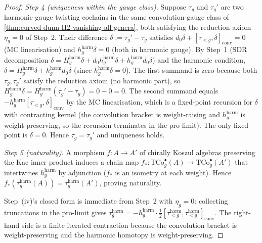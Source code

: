 \begin{proof}
\emph{Step 4 (uniqueness within the gauge class).} Suppose
\(\tau_{g}\) and \(\tau_{g}'\) are two harmonic-gauge twisting
cochains in the same convolution-gauge class of
\autoref{thm:curved-dunn-H2-vanishing-all-genera}, both satisfying
the reduction axiom \(\eta_{g} = 0\) of Step~2. Their difference
\(\delta := \tau_{g}' - \tau_{g}\) satisfies
\(d_{0}\delta + [\tau_{<g}, \delta]_{\mathrm{conv}} = 0\) (MC
linearisation) and \(h^{\mathrm{harm}}_{g}\delta = 0\) (both in
harmonic gauge). By Step~1 (SDR decomposition
\(\delta = H^{\mathrm{harm}}_{g}\delta + d_{0}
h^{\mathrm{harm}}_{g}\delta + h^{\mathrm{harm}}_{g} d_{0}\delta\))
and the harmonic condition, \(\delta = H^{\mathrm{harm}}_{g}\delta
+ h^{\mathrm{harm}}_{g} d_{0}\delta\) (since
\(h^{\mathrm{harm}}_{g}\delta = 0\)). The first summand is zero
because both \(\tau_{g}, \tau_{g}'\) satisfy the reduction axiom
(no harmonic part), so
\(H^{\mathrm{harm}}_{g}\delta = H^{\mathrm{harm}}_{g}(\tau_{g}'
- \tau_{g}) = 0 - 0 = 0\). The second summand equals
\(-h^{\mathrm{harm}}_{g}[\tau_{<g}, \delta]_{\mathrm{conv}}\) by
the MC linearisation, which is a fixed-point recursion for
\(\delta\) with contracting kernel (the convolution bracket is
weight-raising and \(h^{\mathrm{harm}}_{g}\) is weight-preserving,
so the recursion terminates in the pro-limit). The only fixed point
is \(\delta = 0\). Hence \(\tau_{g} = \tau_{g}'\) and uniqueness
holds.

\emph{Step 5 (naturality).} A morphism \(f: A \to A'\) of chirally
Koszul algebras preserving the Kac inner product induces a chain
map \(f_{\ast}: \mathrm{TCo}^{\bullet}_{g}(A) \to
\mathrm{TCo}^{\bullet}_{g}(A')\) that intertwines
\(h^{\mathrm{harm}}_{g}\) by adjunction (\(f_{\ast}\) is an
isometry at each weight). Hence
\(f_{\ast}(\tau_{g}^{\mathrm{harm}}(A)) =
\tau_{g}^{\mathrm{harm}}(A')\), proving naturality.

Step~(iv)'s closed form is immediate from Step~2 with
\(\eta_{g} = 0\): collecting truncations in the pro-limit gives
\(\tau_{g}^{\mathrm{harm}} = -h^{\mathrm{harm}}_{g} \cdot
\tfrac{1}{2}[\tau_{<g}^{\mathrm{harm}},
\tau_{<g}^{\mathrm{harm}}]_{\mathrm{conv}}\). The right-hand side
is a finite iterated contraction because the convolution bracket is
weight-preserving and the harmonic homotopy is weight-preserving.
\end{proof}

